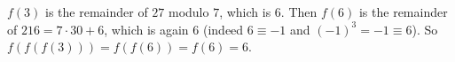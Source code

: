 $f(3)$ is the remainder of $27$ modulo $7$, which is $6$. Then $f(6)$ is the remainder of $216=7\cdot30+6$, which is again $6$ (indeed $6\equiv-1$ and $(-1)^3=-1\equiv6$). So $f(f(f(3)))=f(f(6))=f(6)=\boxed{6}$.
